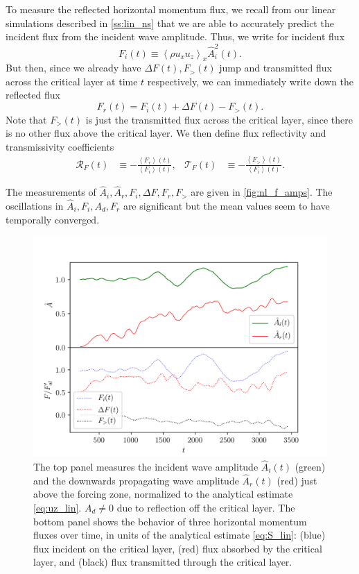 \documentclass[
        fleqn,
        usenatbib,
    ]{mnras}
\newcommand*{\ev}[1]{\left\langle#1\right\rangle}
\begin{document}
To measure the reflected horizontal momentum flux, we recall from our linear
simulations described in \autoref{ss:lin_ns} that we are able to accurately
predict the incident flux from the incident wave amplitude. Thus, we write for
incident flux
\begin{equation}
    F_i(t) \equiv \ev{\rho u_{x} u_{z}}_x\hat{A}_i^2(t).
\end{equation}
But then, since we already have $\Delta F(t), F_>(t)$ jump and transmitted flux
across the critical layer at time $t$ respectively, we can immediately write
down the reflected flux
\begin{equation}
    F_r(t) = F_i(t) + \Delta F(t) - F_>(t).
\end{equation}
Note that $F_>(t)$ is just the transmitted flux across the critical layer, since
there is no other flux above the critical layer. We then define flux
reflectivity and transmissivity coefficients
\begin{align}
    \mathcal{R}_F(t) &\equiv -\frac{\ev{F_r}(t)}{\ev{F_i}(t)},&
    \mathcal{T}_F(t) &\equiv -\frac{\ev{F_>}(t)}{\ev{F_i}(t)}.
        \label{eq:srefl_def}
\end{align}

The measurements of $\hat{A}_i, \hat{A}_r, F_i, \Delta F, F_r, F_>$ are given in
\autoref{fig:nl_f_amps}. The oscillations in $\hat{A}_i, F_i, A_d, F_r$ are
significant but the mean values seem to have temporally converged.

\begin{figure}
    \centering
    \includegraphics[width=\columnwidth]{plots/nl_f_amps.png}
    \caption{The top panel measures the incident wave amplitude $\hat{A}_i(t)$
    (green) and the downwards propagating wave amplitude $\hat{A}_r(t)$ (red)
    just above the forcing zone, normalized to the analytical estimate
    \autoref{eq:uz_lin}. $A_d \neq 0$ due to reflection off the critical layer.
    The bottom panel shows the behavior of three horizontal momentum fluxes over
    time, in units of the analytical estimate \autoref{eq:S_lin}: (blue) flux
    incident on the critical layer, (red) flux absorbed by the critical layer,
    and (black) flux transmitted through the critical
    layer.}\label{fig:nl_f_amps}
\end{figure}
\end{document}
